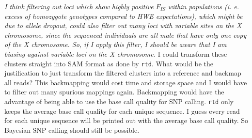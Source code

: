 \documentclass{article}\usepackage[]{graphicx}\usepackage[]{color}
\begin{document}
\emph{I think filtering out loci which show highly positive $F_{IS}$ within populations (i. e. excess of homozygote genotypes compared to HWE expectations), which might be due to allele dropout, could also filter out many loci with variable sites on the X chromosome, since the sequenced individuals are all male that have only one copy of the X chromosome. So, if I apply this filter, I should be aware that I am biasing against variable loci on the X chromosome.}
I could transform these clusters straight into SAM format as done by \texttt{rtd}. What would be the justification to just transform the filtered clusters into a reference and backmap all reads? This backmapping would cost time and storage space and I would have to filter out many spurious mappings again. Backmapping would have the advantage of being able to use the base call quality for SNP calling. \texttt{rtd} only keeps the average base call quality for each unique sequence. I guess every read for each unique sequence will be printed out with the average base call quality. So Bayesian SNP calling should still be possible.

\end{document}
